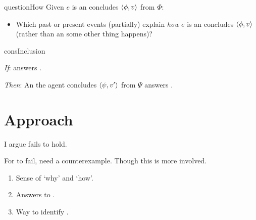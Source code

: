 \documentclass[10pt]{article}
\begin{document}
\begin{note}
  \begin{question}{questionHow}{\qHow{}}
    Given \(e\) is an  \vAgent{} concludes \(\langle\phi, v\rangle\) from \(\Phi\):
    \begin{itemize}
    \item
      Which past or present events (partially) explain \emph{how} \(e\) is an  \vAgent{} concludes \(\langle\phi, v\rangle\) (rather than an  some other thing happens)?
    \end{itemize}
    \vspace{-1.5\baselineskip}
  \end{question}
\end{note}


\begin{note}
  \begin{constraint}{consInclusion}{\issueInclusion{}}
    \mbox{ }
    \vspace{-\baselineskip}
    \begin{itenum}
    \item[\emph{If}:]
       answers \qWhy{}.
    \item[\emph{Then}:]
      An  the agent concludes \(\langle\psi, v'\rangle\) from \(\Psi\) answers \qHow{}.
    \end{itenum}
    \vspace{-\baselineskip}
  \end{constraint}
\end{note}


\section{Approach}
\label{sec:approach}

\begin{note}
  I argue \issueInclusion{} fails to hold.
\end{note}


\begin{note}
  For \issueInclusion{} to fail, need a counterexample.
  Though this is more involved.

  \begin{enumerate}
  \item
    Sense of `why' and `how'.
  \item
    Answers to \qWhy{}.
  \item
    Way to identify \fingfr{}.
  \end{enumerate}
\end{note}
\end{document}
